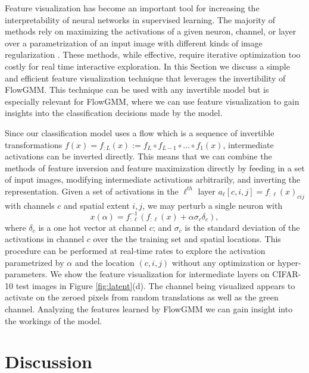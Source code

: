 \documentclass{article}
\newcommand{\method}{FlowGMM\xspace}
\begin{document}
Feature visualization has become an important tool for increasing the interpretability of neural networks in supervised learning. 
The majority of methods rely on maximizing the activations of a given neuron, channel, or layer over a parametrization of an input image with different kinds of image regularization \citep{szegedy2013intriguing,olah2017feature,mahendran2015understanding}. 
These methods, while effective, require iterative optimization too costly for real time interactive exploration.
In this Section we discuss a simple and efficient feature visualization technique that leverages the invertibility of \method. 
This technique can be used with any invertible model but is especially relevant for \method, where we can use feature visualization to gain insights into the classification decisions made by the model.  

Since our classification model uses a flow which is a sequence of invertible transformations $f(x) = f_{:L}(x) := f_L \circ f_{L-1} \circ \dots \circ f_1(x)$, intermediate activations can be inverted directly. This means that we can combine the methods of feature inversion and feature maximization directly by feeding in a set of input images, modifying intermediate activations arbitrarily, and inverting the representation. Given a set of activations in the $\ell^{th}$ layer $a_\ell[c,i,j] =f_{:\ell}(x)_{cij}$ with channels $c$ and spatial extent $i,j$, we may perturb a single neuron with 
\begin{equation}
    x(\alpha) = f_{:\ell}^{-1}(f_{:\ell}(x) + \alpha \sigma_c \delta_{c}),
\end{equation} 
where $\delta_{c}$ is a one hot vector at channel $c$; and $\sigma_c$ is the standard deviation of the activations in channel $c$ over the the training set and spatial locations. 
This procedure can be performed at real-time rates to explore the activation parametrized by $\alpha$ and the location $(c,i,j)$ 
without any optimization or hyper-parameters. We show the feature visualization for intermediate layers on CIFAR-10 test images in Figure \ref{fig:latent}(d). The channel being visualized appears to activate on the zeroed pixels from random translations as well as the green channel.
Analyzing the features learned by \method we can gain insight into the workings of the model.

\section{Discussion}
\end{document}
